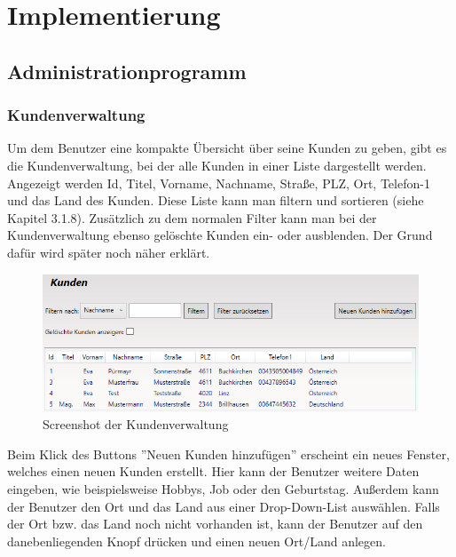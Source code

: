 \chapter{Implementierung}\label{cha:theoretical-background}
\section{Administrationprogramm}
\subsection{Kundenverwaltung}
Um dem Benutzer eine kompakte Übersicht über seine Kunden zu geben, gibt es die Kundenverwaltung, bei der alle Kunden in einer Liste dargestellt werden. Angezeigt werden Id, Titel, Vorname, Nachname, Straße, PLZ, Ort, Telefon-1 und das Land des Kunden. Diese Liste kann man filtern und sortieren (siehe Kapitel 3.1.8). Zusätzlich zu dem normalen Filter kann man bei der Kundenverwaltung ebenso gelöschte Kunden ein- oder ausblenden. Der Grund dafür wird später noch näher erklärt.
\begin{figure}[H]
\begin{center}
	\includegraphics[scale=.77]{images/Kunden.png}
\end{center}
	\caption{Screenshot der Kundenverwaltung}
	\label{fig:sample}
\end{figure}
\noindent Beim Klick des Buttons ''Neuen Kunden hinzufügen'' erscheint ein neues Fenster, welches einen neuen Kunden erstellt. Hier kann der Benutzer weitere Daten eingeben, wie beispielsweise Hobbys, Job oder den Geburtstag. Außerdem kann der Benutzer den Ort und das Land aus einer Drop-Down-List auswählen. Falls der Ort bzw. das Land noch nicht vorhanden ist, kann der Benutzer auf den danebenliegenden Knopf drücken und einen neuen Ort/Land anlegen. 
